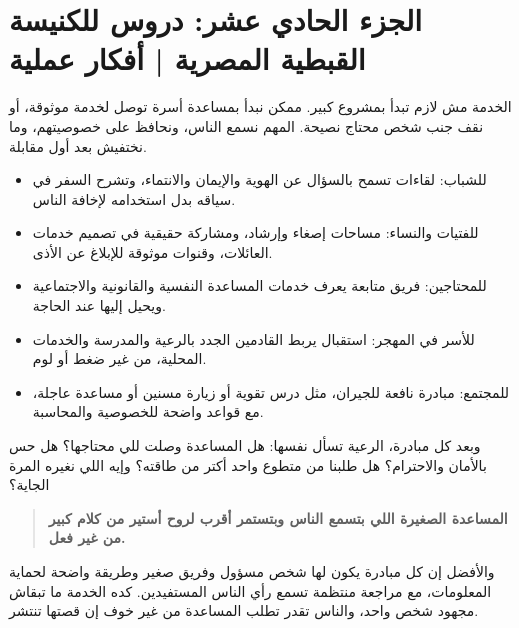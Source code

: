 \documentclass[12pt,a4paper]{article}
\begin{document}
\section*{الجزء الحادي عشر: دروس للكنيسة القبطية المصرية | أفكار عملية}
الخدمة مش لازم تبدأ بمشروع كبير. ممكن نبدأ بمساعدة أسرة توصل لخدمة موثوقة، أو نقف جنب شخص محتاج نصيحة. المهم نسمع الناس، ونحافظ على خصوصيتهم، وما نختفيش بعد أول مقابلة.\par\medskip
\begin{itemize}[rightmargin=1.2em,leftmargin=0.5em,itemsep=0.25em,topsep=0.2em]
\item للشباب: لقاءات تسمح بالسؤال عن الهوية والإيمان والانتماء، وتشرح السفر في سياقه بدل استخدامه لإخافة الناس.
\item للفتيات والنساء: مساحات إصغاء وإرشاد، ومشاركة حقيقية في تصميم خدمات العائلات، وقنوات موثوقة للإبلاغ عن الأذى.
\item للمحتاجين: فريق متابعة يعرف خدمات المساعدة النفسية والقانونية والاجتماعية ويحيل إليها عند الحاجة.
\item للأسر في المهجر: استقبال يربط القادمين الجدد بالرعية والمدرسة والخدمات المحلية، من غير ضغط أو لوم.
\item للمجتمع: مبادرة نافعة للجيران، مثل درس تقوية أو زيارة مسنين أو مساعدة عاجلة، مع قواعد واضحة للخصوصية والمحاسبة.
\end{itemize}\medskip
وبعد كل مبادرة، الرعية تسأل نفسها: هل المساعدة وصلت للي محتاجها؟ هل حس بالأمان والاحترام؟ هل طلبنا من متطوع واحد أكتر من طاقته؟ وإيه اللي نغيره المرة الجاية؟\par\medskip
\begin{quote}\colorbox{soft}{\parbox{0.94\linewidth}{\textbf{المساعدة الصغيرة اللي بتسمع الناس وبتستمر أقرب لروح أستير من كلام كبير من غير فعل.}}}\end{quote}
والأفضل إن كل مبادرة يكون لها شخص مسؤول وفريق صغير وطريقة واضحة لحماية المعلومات، مع مراجعة منتظمة تسمع رأي الناس المستفيدين. كده الخدمة ما تبقاش مجهود شخص واحد، والناس تقدر تطلب المساعدة من غير خوف إن قصتها تنتشر.\par\medskip
\clearpage
\clearpage
\end{document}
